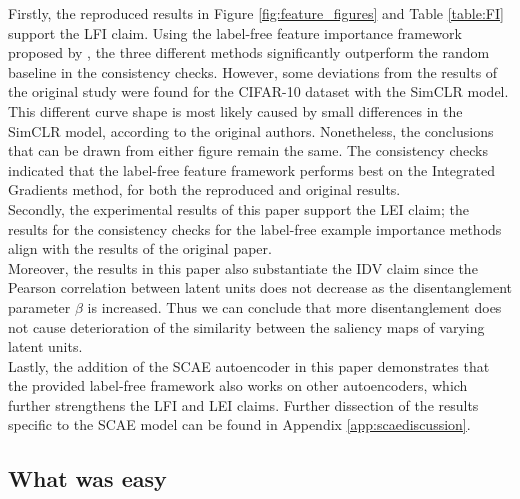 Firstly, the reproduced results in Figure \ref{fig:feature_figures} and Table \ref{table:FI} support the LFI claim. Using the label-free feature importance framework proposed by \citeauthor{LabelFreeExplainability}, the three different methods significantly outperform the random baseline in the consistency checks. However, some deviations from the results of the original study were found for the CIFAR-10 dataset with the SimCLR model. This different curve shape is most likely caused by small differences in the SimCLR model, according to the original authors. Nonetheless, the conclusions that can be drawn from either figure remain the same. The consistency checks indicated that the label-free feature framework performs best on the Integrated Gradients method, for both the reproduced and original results.
\\
Secondly, the experimental results of this paper support the LEI claim; the results for the consistency checks for the label-free example importance methods align with the results of the original paper.\\
Moreover, the results in this paper also substantiate the IDV claim since the Pearson correlation between latent units does not decrease as the disentanglement parameter $\beta$ is increased. Thus we can conclude that more disentanglement does not cause deterioration of the similarity between the saliency maps of varying latent units.\\
Lastly, the addition of the SCAE autoencoder in this paper demonstrates that the provided label-free framework also works on other autoencoders, which further strengthens the LFI and LEI claims. Further dissection of the results specific to the SCAE model can be found in Appendix \ref{app:scaediscussion}.



\subsection{What was easy}

